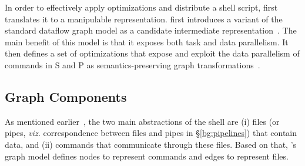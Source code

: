 \documentclass[acmsmall,10pt,review,anonymous]{acmart}
\newcommand{\ttt}[1]{\texttt{\small #1}}
\newcommand{\cn}[1]{\mbox{\textcircled{\footnotesize #1}}}
\newcommand{\pur}{\cn{\textsc{P}}\xspace}
\newcommand{\sta}{\cn{\textsc{S}}\xspace}
\begin{document}



In order to effectively apply optimizations and distribute a shell script, \sys first translates it to a manipulable representation.
\sys first introduces a variant of the standard dataflow graph model as a candidate intermediate representation~.
The main benefit of this model is that it exposes both task and data parallelism.
It then defines a set of optimizations that expose and exploit the data parallelism of commands in \sta and \pur as semantics-preserving graph transformations~.

\subsection{Graph Components}
\label{graph-components}

As mentioned earlier~, the two main abstractions of the
shell are (i) files (or pipes, \emph{viz.} correspondence between files and pipes in \S\ref{bg:pipelines}) that contain data, and (ii) commands that communicate
through these files. Based on that, \sys's graph model defines nodes to represent commands and edges to represent files.
\end{document}
